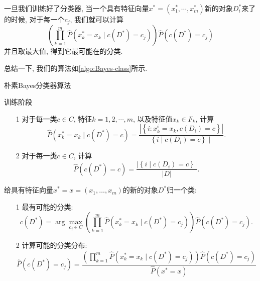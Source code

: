 一旦我们训练好了分类器, 当一个具有特征向量$x^*=(x_1^*, \cdots, x_m^*)$新的对象$D_i^*$来了的时候, 对于每一个$c_j$, 我们就可以计算$$
\left(\prod_{k=1}^m \hat{P}\left(x_k^*=x_k \mid c\left(D^*\right)=c_j\right)\right) \hat{P}\left(c\left(D^*\right)=c_j\right)
$$
并且取最大值, 得到它最可能在的分类. 

总结一下, 我们的算法如\cref{algo:Bayes-class}所示. 

\begin{algorithm}
    \caption{朴素Bayes分类器算法}
    \label{algo:Bayes-class}

    训练阶段
    \begin{itemize}
        \item [1] 对于每一类$c\in C$, 特征$k=1,2,\cdots, m$, 以及特征值$x_k\in F_k$, 计算$$
        \hat{P}\left(x_k^*=x_k \mid c\left(D^*\right)=c\right)=\frac{\left|\left\{i: x_k^i=x_k, c\left(D_i\right)=c\right\}\right|}{\left\{i \mid c\left(D_i\right)=c\right\} \mid} .
        $$
        \item [2] 对于每一类$c\in C$, 计算$$
        \hat{P}\left(c\left(D^*\right)=c\right)=\frac{\left|\left\{i \mid c\left(D_i\right)=c\right\}\right|}{|D|} .
        $$
    \end{itemize}

    给具有特征向量$x^*=x=\left(x_1, \ldots, x_m\right)$的新的对象$D^*$归一个类: 
    \begin{itemize}
        \item [1] 最有可能的分类: $$c\left(D^*\right)=\arg \max _{c_j \in C}\left(\prod_{k=1}^m \hat{P}\left(x_k^*=x_k \mid c\left(D^*\right)=c_j\right)\right) \hat{P}\left(c\left(D^*\right)=c_j\right) .$$
        \item [2] 计算可能的分类分布:$$\hat{P}\left(c\left(D^*\right)=c_j\right)=\frac{\left(\prod_{k=1}^m \hat{P}\left(x_k^*=x_k \mid c\left(D^*\right)=c_j\right)\right) \hat{P}\left(c\left(D^*\right)=c_j\right)}{\hat{P}\left(x^*=x\right)}$$
    \end{itemize}
\end{algorithm}
